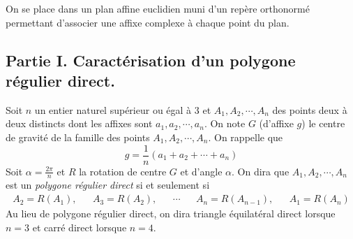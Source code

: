 On se place dans un plan affine euclidien muni d'un repère orthonormé permettant d'associer une affixe complexe à chaque point du plan.
\subsection*{Partie I. Caractérisation d'un polygone régulier direct.}
Soit $n$ un entier naturel supérieur ou égal à $3$ et $A_1, A_2, \cdots , A_n$ des points deux à deux distincts dont les affixes sont $a_1,a_2,\cdots, a_n$.\newline
On note $G$ (d'affixe $g$) le centre de gravité de la famille des points $A_1, A_2, \cdots , A_n$. On rappelle que
\begin{displaymath}
 g = \frac{1}{n}(a_1 + a_2 + \cdots + a_n)
\end{displaymath}
Soit $\alpha = \frac{2\pi}{n}$ et $R$ la rotation de centre $G$ et d'angle $\alpha$.\newline
On dira que $A_1, A_2, \cdots , A_n$ est un \emph{polygone régulier direct} si et seulement si 
\begin{align*}
 A_2 = R(A_1), & & A_3 = R(A_2), & & \cdots & & A_n = R(A_{n-1}), & & A_1 = R(A_n)
\end{align*}
Au lieu de polygone régulier direct, on dira triangle équilatéral direct lorsque $n=3$ et carré direct lorsque $n=4$.
